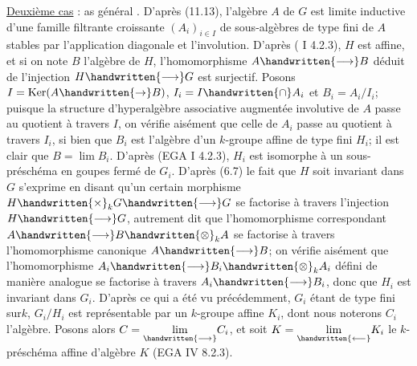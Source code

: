 \uline{Deuxième cas} : as général . D'après (11.13), l'algèbre $A$ de $G$ est limite inductive d'une famille filtrante croissante $(A_i)_{i\in I}$ de sous-algèbres de type fini de $A$ stables par l'application diagonale et l'involution. D'après ( I 4.2.3), $H$ est affine, et si on note $B$ l'algèbre de $H$, l'homomorphisme $A\handwritten{\longrightarrow}B$ déduit de l'injection $H\handwritten{\longrightarrow}G$ est surjectif. Posons $I=\operatorname{Ker}(A\handwritten{\to}B)$, $I_i=I\handwritten{\cap}A_i$ et $B_i=A_i/I_i$; puisque la structure d'hyperalgèbre associative augmentée involutive de $A$ passe au quotient à travers $I$, on vérifie aisément que celle de $A_i$ passe au quotient à travers $I_i$, si bien que $B_i$ est l'algèbre d'un $k$-groupe affine de type fini $H_i$; il est clair que $B=\lim B_i$. D'après (EGA I 4.2.3), $H_i$ est isomorphe à un sous-préschéma en goupes fermé de $G_i$. D'après (6.7) le fait que $H$ soit invariant dans $G$ s'exprime en disant qu'un certain morphisme $H\handwritten{\times}_k G\handwritten{\longrightarrow}G$ se factorise à travers l'injection $H\handwritten{\longrightarrow}G$, autrement dit que l'homomorphisme correspondant $A\handwritten{\longrightarrow}B\handwritten{\otimes}_k A$ se factorise à travers l'homomorphisme canonique $A\handwritten{\longrightarrow}B$; on vérifie aisément que l'homomorphisme $A_i\handwritten{\longrightarrow}B_i\handwritten{\otimes}_k A_i$ défini de manière analogue se factorise à travers $A_i\handwritten{\longrightarrow}B_i$, donc que $H_i$ est invariant dans $G_i$. D'après ce qui a été vu précédemment, $G_i$ étant de type fini sur$k$, $G_i/H_i$ est représentable par un $k$-groupe affine $K_i$, dont nous noterons $C_i$ l'algèbre. Posons alors $C=\underset{\handwritten{\longrightarrow}}{\lim}C_i$, et soit $K=\underset{\handwritten{\longleftarrow}}{\lim}K_i$ le $k$-préschéma affine d'algèbre $K$ (EGA IV 8.2.3).


